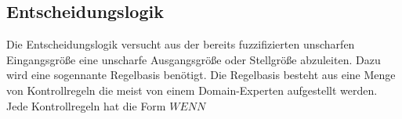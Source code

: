 \documentclass[12pt,a4paper,bibliography=totocnumbered,listof=totocnumbered]{scrartcl}
\begin{document}
\subsection{Entscheidungslogik}

Die Entscheidungslogik versucht aus der bereits fuzzifizierten unscharfen Eingangsgröße eine unscharfe Ausgangsgröße oder Stellgröße abzuleiten. Dazu wird eine sogennante Regelbasis benötigt. Die Regelbasis besteht aus eine Menge von Kontrollregeln die meist von einem Domain-Experten aufgestellt werden. Jede Kontrollregeln hat die Form $WENN$
\end{document}
